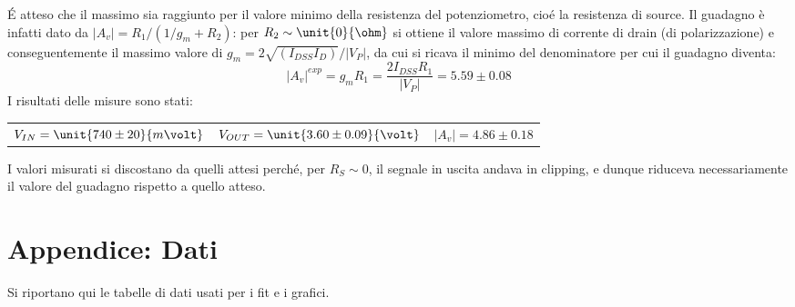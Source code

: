 \documentclass[10pt,a4paper]{article}
\begin{document}
\'E atteso che il massimo sia raggiunto per il valore minimo della resistenza del potenziometro, cioé la resistenza di source.
Il guadagno è infatti dato da $|A_v| =R_1/(1/g_m + R_2)$: per $R_2\sim\unit{0}{\ohm}$ si ottiene il valore massimo di corrente di drain (di polarizzazione) e conseguentemente il massimo valore di $g_m = 2 \sqrt{(I_{DSS} I_D)}/|V_P|$, da cui si ricava il minimo del denominatore per cui il guadagno diventa:
\begin{equation*}
|A_v|^{exp} = g_m R_1 = \frac{2 I_{DSS} R_1}{|V_P|} = 5.59 \pm 0.08 
\end{equation*}
I risultati delle misure sono stati:
\begin{table}[h!]
	\centering
	\begin{tabular}{ccc}
		$V_{IN}=\unit{740 \pm 20}{m\volt}$ & $V_{OUT} = \unit{3.60 \pm 0.09}{\volt}$ & $|A_v| = 4.86 \pm 0.18$\\
	\end{tabular}
\end{table}

I valori misurati si discostano da quelli attesi perché, per $R_S \sim 0$, il segnale in uscita andava in clipping, e dunque riduceva necessariamente il valore del guadagno rispetto a quello atteso.

\pagebreak
\section{Appendice: Dati}
Si riportano qui le tabelle di dati usati per i fit e i grafici.

\centering
\begin{figure}[h!]
	\begin{minipage}[t]{0.33\textwidth}
		\centering
		\resizebox{1\textwidth}{!}{
		}
		\label{njfet}
	\end{minipage}
	\begin{minipage}[t]{0.33\textwidth}
		\resizebox{1\textwidth}{!}{
		}
		\label{tab:commonsource}
	\end{minipage}
	\begin{minipage}[t]{0.32\textwidth}
		\centering
		\resizebox{1\textwidth}{!}{
		}
		\label{tab:sourcefollower}
	\end{minipage}
\end{figure}

	\begin{minipage}[c]{0.33\textwidth}
		\centering
		\resizebox{1\textwidth}{!}{
			}
		\label{tab:iddependance}
	\end{minipage}
\end{document}
